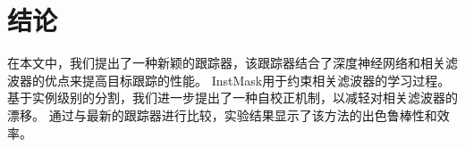 \section{结论}
在本文中，我们提出了一种新颖的跟踪器，该跟踪器结合了深度神经网络和相关滤波器的优点来提高目标跟踪的性能。
InstMask用于约束相关滤波器的学习过程。基于实例级别的分割，我们进一步提出了一种自校正机制，以减轻对相关滤波器的漂移。
通过与最新的跟踪器进行比较，实验结果显示了该方法的出色鲁棒性和效率。